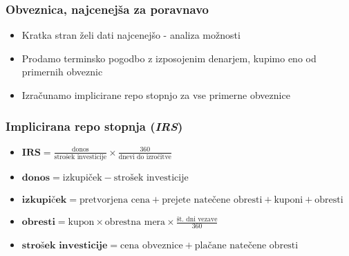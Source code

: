 \documentclass[14pt]{beamer}
\begin{document}
\begin{frame}
    \frametitle{Obveznica, najcenejša za poravnavo}
    
    \begin{itemize}
        \item Kratka stran želi dati najcenejšo - analiza možnosti
        \item Prodamo terminsko pogodbo z izposojenim denarjem, 
                kupimo eno od primernih obveznic
        \item Izračunamo implicirane repo stopnjo za vse primerne obveznice
    \end{itemize}


\end{frame}


\begin{frame}
    \frametitle{Implicirana repo stopnja (\textit{IRS})}
    
    \begin{itemize}
        \item \textit{$ \textbf{IRS} = \frac{\text{donos}}{\text{strošek investicije}} 
                \times \frac{360}{\text{dnevi do izročitve}} $}
        \item \textit{$ \textbf{donos} = \text{izkupiček} - \text{strošek investicije} $}
        \item \textit{$ \textbf{izkupiček} = \text{pretvorjena cena} + \text{prejete natečene obresti} 
                + \text{kuponi} + \text{obresti} $}
        \item \textit{$ \textbf{obresti} =  \text{kupon} \times \text{obrestna mera} \times 
                \frac{\text{št. dni vezave}}{360} $}
        \item \textit{$ \textbf{strošek investicije} = \text{cena obveznice} + 
                \text{plačane natečene obresti}$}
    \end{itemize}


\end{frame}
\end{document}
